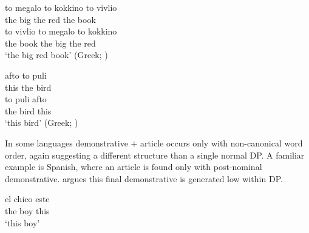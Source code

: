 \documentclass[output=paper,
colorlinks,
citecolor=brown,
newtxmath
]{langscibook}
\begin{document}
\ea \label{ex:bigred}
\ea
\gll to megalo to kokkino to vivlio\\
     the big the red the book\\ %

\ex
\gll to vivlio to megalo to kokkino\\
    the book the big the red\\
\glt `the big red book' \hfill (Greek; \citealt{Alexiadou.Wilder1998}) %
\z
\z




\ea \label{bird}
\ea
\gll afto to puli\\
     this the bird\\ %

\ex
\gll to puli afto\\
    the bird this\\
\glt `this bird' \hfill (Greek; \citealt{Joseph2019})
\z
\z


\noindent In some languages demonstrative $+$ article occurs only with non-canonical word order, again suggesting a different structure than a single normal DP. A familiar example is Spanish, where an article is found only with post-nominal demonstrative. \cite{Giusti2002} argues this final demonstrative is generated low within DP.




\ea \label{ex:Spanish}
\ea
\gll el chico  este \\
     the boy  this\\
     \glt `this  boy'
\end{document}
